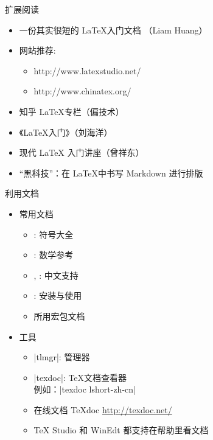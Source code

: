 \begin{frame}{扩展阅读}
  \begin{itemize}
    \item 一份其实很短的 \LaTeX 入门文档 （Liam Huang） 
    \item 网站推荐:
      \begin{itemize}
        \item http://www.latexstudio.net/
        \item http://www.chinatex.org/
      \end{itemize}
    \item 知乎 \LaTeX 专栏（偏技术）
    \item 《\LaTeX 入门》（刘海洋）
    \item 现代 LaTeX 入门讲座（曾祥东）
    \item “黑科技”：在 \LaTeX 中书写 Markdown 进行排版 
  \end{itemize}
\end{frame}


\begin{frame}[fragile]{利用文档}
  \begin{itemize}
    \item 常用文档
      \begin{itemize}
        \item {}: 符号大全
        \item {}: 数学参考
        \item {}, : 中文支持
        \item {}: \TL 安装与使用
        \item 所用宏包文档
      \end{itemize}
    \item 工具
      \begin{itemize}
        \item |tlmgr|: \TL 管理器
        \item |texdoc|: \TeX 文档查看器\\
          例如：|texdoc lshort-zh-cn|
        \item 在线文档 \TeX doc \url{http://texdoc.net/}
        \item TeX Studio 和 WinEdt 都支持在帮助里看文档
      \end{itemize}
  \end{itemize}
\end{frame}

